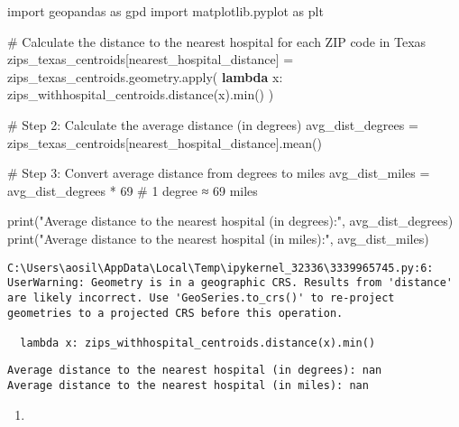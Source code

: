 \documentclass[
  letterpaper,
  DIV=11,
  numbers=noendperiod]{scrartcl}
\newenvironment{Shaded}{\begin{snugshade}}{\end{snugshade}}
\newcommand{\BuiltInTok}[1]{\textcolor[rgb]{0.00,0.23,0.31}{#1}}
\newcommand{\CommentTok}[1]{\textcolor[rgb]{0.37,0.37,0.37}{#1}}
\newcommand{\DecValTok}[1]{\textcolor[rgb]{0.68,0.00,0.00}{#1}}
\newcommand{\ImportTok}[1]{\textcolor[rgb]{0.00,0.46,0.62}{#1}}
\newcommand{\KeywordTok}[1]{\textcolor[rgb]{0.00,0.23,0.31}{\textbf{#1}}}
\newcommand{\NormalTok}[1]{\textcolor[rgb]{0.00,0.23,0.31}{#1}}
\newcommand{\OperatorTok}[1]{\textcolor[rgb]{0.37,0.37,0.37}{#1}}
\newcommand{\StringTok}[1]{\textcolor[rgb]{0.13,0.47,0.30}{#1}}
\providecommand{\tightlist}{%
  \setlength{\itemsep}{0pt}\setlength{\parskip}{0pt}}\usepackage{longtable,booktabs,array}
\begin{document}
\begin{Shaded}
\begin{Highlighting}[]
\ImportTok{import}\NormalTok{ geopandas }\ImportTok{as}\NormalTok{ gpd}
\ImportTok{import}\NormalTok{ matplotlib.pyplot }\ImportTok{as}\NormalTok{ plt}

\CommentTok{\# Calculate the distance to the nearest hospital for each ZIP code in Texas}
\NormalTok{zips\_texas\_centroids[}\StringTok{\textquotesingle{}nearest\_hospital\_distance\textquotesingle{}}\NormalTok{] }\OperatorTok{=}\NormalTok{ zips\_texas\_centroids.geometry.}\BuiltInTok{apply}\NormalTok{(}
    \KeywordTok{lambda}\NormalTok{ x: zips\_withhospital\_centroids.distance(x).}\BuiltInTok{min}\NormalTok{()}
\NormalTok{)}

\CommentTok{\# Step 2: Calculate the average distance (in degrees)}
\NormalTok{avg\_dist\_degrees }\OperatorTok{=}\NormalTok{ zips\_texas\_centroids[}\StringTok{\textquotesingle{}nearest\_hospital\_distance\textquotesingle{}}\NormalTok{].mean()}

\CommentTok{\# Step 3: Convert average distance from degrees to miles}
\NormalTok{avg\_dist\_miles }\OperatorTok{=}\NormalTok{ avg\_dist\_degrees }\OperatorTok{*} \DecValTok{69}  \CommentTok{\# 1 degree ≈ 69 miles}

\BuiltInTok{print}\NormalTok{(}\StringTok{"Average distance to the nearest hospital (in degrees):"}\NormalTok{, avg\_dist\_degrees)}
\BuiltInTok{print}\NormalTok{(}\StringTok{"Average distance to the nearest hospital (in miles):"}\NormalTok{, avg\_dist\_miles)}
\end{Highlighting}
\end{Shaded}

\begin{verbatim}
C:\Users\aosil\AppData\Local\Temp\ipykernel_32336\3339965745.py:6: UserWarning: Geometry is in a geographic CRS. Results from 'distance' are likely incorrect. Use 'GeoSeries.to_crs()' to re-project geometries to a projected CRS before this operation.

  lambda x: zips_withhospital_centroids.distance(x).min()
\end{verbatim}

\begin{verbatim}
Average distance to the nearest hospital (in degrees): nan
Average distance to the nearest hospital (in miles): nan
\end{verbatim}

\begin{enumerate}
\def\labelenumi{\alph{enumi}.}
\setcounter{enumi}{1}
\tightlist
\item
\end{enumerate}
\end{document}
